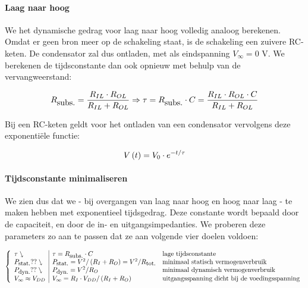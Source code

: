 \paragraph{Laag naar hoog}
We het dynamische gedrag voor laag naar hoog volledig analoog berekenen. Omdat er geen bron meer op de schakeling staat, is de schakeling een zuivere RC-keten. De condensator zal dus ontladen, met als eindspanning $V_{\infty}=0\mbox{ V}$. We berekenen de tijdsconstante dan ook opnieuw met behulp van de vervangweerstand:

\begin{equation}
R_{\mbox{subs.}}=\displaystyle\frac{R_{IL}\cdot R_{OL}}{R_{IL}+R_{OL}}\Rightarrow \tau=R_{\mbox{subs.}}\cdot C=\displaystyle\frac{R_{IL}\cdot R_{OL}\cdot C}{R_{IL}+R_{OL}}
\eqnlab{tauLH}
\end{equation}

Bij een RC-keten geldt voor het ontladen van een condensator vervolgens deze exponenti\"ele functie:

\begin{equation}
V\left( t \right)=V_0\cdot e^{-t/\tau}
\end{equation}

\paragraph{Tijdsconstante minimaliseren}
We zien dus dat we - bij overgangen van laag naar hoog en hoog naar laag - te maken hebben met exponentieel tijdsgedrag. Deze constante wordt bepaald door de capaciteit, en door de in- en uitgangsimpedanties. We proberen deze parameters zo aan te passen dat ze aan volgende vier doelen voldoen:

\begin{equation}
\left\{\begin{array}{l|ll}
\tau\ssearrow&\tau=R_{\mbox{\small{subs.}}}\cdot C&\mbox{lage tijdsconstante}\\
P_{\mbox{\small{stat.}}}??\ssearrow&P_{\mbox{\small{stat.}}}=V^2/\left(R_I+R_O\right)=V^2/R_{\mbox{\small{tot.}}}&\mbox{minimaal statisch vermogenverbruik}\\
P_{\mbox{\small{dyn.}}}??\ssearrow&P_{\mbox{\small{dyn.}}}=V^2/R_O&\mbox{minimaal dynamisch vermogenverbruik}\\
V_{\infty}\approx V_{DD}&V_{\infty}=R_I\cdot V_{DD}/\left(R_I+R_O\right)&\mbox{uitgangsspanning dicht bij de voedingsspanning}\\
\end{array}\right.
\eqnlab{PVTsummary}
\end{equation}

